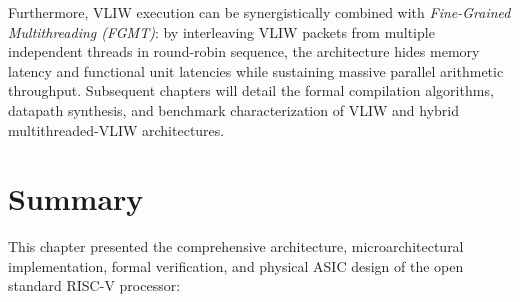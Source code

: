 Furthermore, VLIW execution can be synergistically combined with \textit{Fine-Grained Multithreading (FGMT)}: by interleaving VLIW packets from multiple independent threads in round-robin sequence, the architecture hides memory latency and functional unit latencies while sustaining massive parallel arithmetic throughput. Subsequent chapters will detail the formal compilation algorithms, datapath synthesis, and benchmark characterization of VLIW and hybrid multithreaded-VLIW architectures.


\section{Summary}\label{riscvSummary}

This chapter presented the comprehensive architecture, microarchitectural implementation, formal verification, and physical ASIC design of the open standard RISC-V processor:
